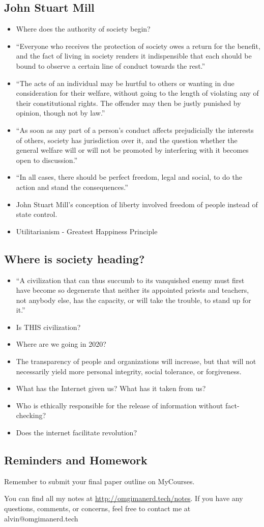 \documentclass[letterpaper, 12pt]{article}
\begin{document}
\subsection*{John Stuart Mill}
\begin{itemize}
  \item Where does the authority of society begin?
  \item ``Everyone who receives the protection of society owes a return for the
    benefit, and the fact of living in society renders it indispensible that
    each should be bound to observe a certain line of conduct towards the
    rest.''
  \item ``The acts of an individual may be hurtful to others or wanting in due
    consideration for their welfare, without going to the length of violating
    any of their constitutional rights. The offender may then be justly
    punished by opinion, though not by law.''
  \item ``As soon as any part of a person's conduct affects prejudicially the
    interests of others, society has jurisdiction over it, and the question
    whether the general welfare will or will not be promoted by interfering
    with it becomes open to discussion.''
  \item ``In all cases, there should be perfect freedom, legal and social, to
    do the action and stand the consequences.''
  \item John Stuart Mill's conception of liberty involved freedom of people
    instead of state control.
  \item Utilitarianism - Greatest Happiness Principle
\end{itemize}

\subsection*{Where is society heading?}
\begin{itemize}
  \item ``A civilization that can thus succumb to its vanquished enemy must
    first have become so degenerate that neither its appointed priests and
    teachers, not anybody else, has the capacity, or will take the trouble, to
    stand up for it.''
  \item Is THIS civilization?
  \item Where are we going in 2020?
  \item The transparency of people and organizations will increase, but that
    will not necessarily yield more personal integrity, social tolerance, or
    forgiveness.
  \item What has the Internet given us? What has it taken from us?
  \item Who is ethically responsible for the release of information without
    fact-checking?
  \item Does the internet facilitate revolution?
\end{itemize}

\subsection*{Reminders and Homework}
Remember to submit your final paper outline on MyCourses.

\begin{center}
  You can find all my notes at \url{http://omgimanerd.tech/notes}. If you have
  any questions, comments, or concerns, feel free to contact me at
  alvin@omgimanerd.tech
\end{center}
\end{document}
